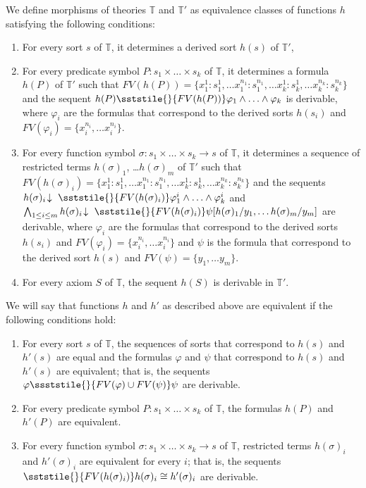 We define morphisms of theories $\mathbb{T}$ and $\mathbb{T}'$ as equivalence classes of functions $h$ satisfying the following conditions:
\begin{enumerate}
\item For every sort $s$ of $\mathbb{T}$, it determines a derived sort $h(s)$ of $\mathbb{T}'$,
\item For every predicate symbol $P : s_1 \times \ldots \times s_k$ of $\mathbb{T}$, it determines a formula $h(P)$ of $\mathbb{T}'$
such that $FV(h(P)) = \{ x^1_1 : s^1_1, \ldots x^{n_1}_1 : s^{n_1}_1, \ldots x^1_k : s^1_k, \ldots x^{n_k}_k : s^{n_k}_k \}$
and the sequent $h(P) \sststile{}{FV(h(P))} \varphi_1 \land \ldots \land \varphi_k$ is derivable,
where $\varphi_i$ are the formulas that correspond to the derived sorts $h(s_i)$ and $FV(\varphi_i) = \{ x^{n_i}_i, \ldots x^{n_i}_i \}$.
\item For every function symbol $\sigma : s_1 \times \ldots \times s_k \to s$ of $\mathbb{T}$,
it determines a sequence of restricted terms $h(\sigma)_1$, \ldots $h(\sigma)_m$ of $\mathbb{T}'$
such that $FV(h(\sigma)_i) = \{ x^1_1 : s^1_1, \ldots x^{n_1}_1 : s^{n_1}_1, \ldots x^1_k : s^1_k, \ldots x^{n_k}_k : s^{n_k}_k \}$
and the sequents $h(\sigma)_i\!\downarrow\ \sststile{}{FV(h(\sigma)_i)} \varphi^i_1 \land \ldots \land \varphi^i_k$
and $\bigwedge_{1 \leq i \leq m} h(\sigma)_i\!\downarrow\ \sststile{}{FV(h(\sigma)_i)} \psi[h(\sigma)_1/y_1, \ldots h(\sigma)_m/y_m]$ are derivable,
where $\varphi_i$ are the formulas that correspond to the derived sorts $h(s_i)$ and $FV(\varphi_i) = \{ x^{n_i}_i, \ldots x^{n_i}_i \}$
and $\psi$ is the formula that correspond to the derived sort $h(s)$ and $FV(\psi) = \{ y_1, \ldots y_m \}$.
\item For every axiom $S$ of $\mathbb{T}$, the sequent $h(S)$ is derivable in $\mathbb{T}'$.
\end{enumerate}

We will say that functions $h$ and $h'$ as described above are equivalent if the following conditions hold:
\begin{enumerate}
\item For every sort $s$ of $\mathbb{T}$, the sequences of sorts that correspond to $h(s)$ and $h'(s)$ are equal
and the formulas $\varphi$ and $\psi$ that correspond to $h(s)$ and $h'(s)$ are equivalent;
that is, the sequents $\varphi \ssststile{}{FV(\varphi) \cup FV(\psi)} \psi$ are derivable.
\item For every predicate symbol $P : s_1 \times \ldots \times s_k$ of $\mathbb{T}$, the formulas $h(P)$ and $h'(P)$ are equivalent.
\item For every function symbol $\sigma : s_1 \times \ldots \times s_k \to s$ of $\mathbb{T}$, restricted terms $h(\sigma)_i$ and $h'(\sigma)_i$ are equivalent for every $i$;
that is, the sequents $\sststile{}{FV(h(\sigma)_i)} h(\sigma)_i \cong h'(\sigma)_i$ are derivable.
\end{enumerate}

